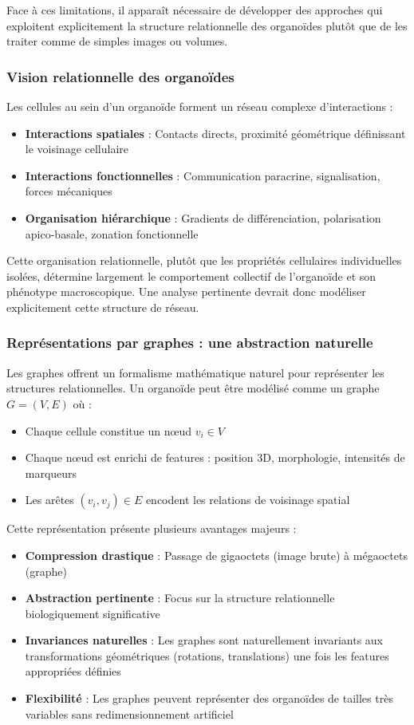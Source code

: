 Face à ces limitations, il apparaît nécessaire de développer des approches qui exploitent explicitement la structure relationnelle des organoïdes plutôt que de les traiter comme de simples images ou volumes.

\subsubsection{Vision relationnelle des organoïdes}

Les cellules au sein d'un organoïde forment un réseau complexe d'interactions :
\begin{itemize}
    \item \textbf{Interactions spatiales} : Contacts directs, proximité géométrique définissant le voisinage cellulaire
    \item \textbf{Interactions fonctionnelles} : Communication paracrine, signalisation, forces mécaniques
    \item \textbf{Organisation hiérarchique} : Gradients de différenciation, polarisation apico-basale, zonation fonctionnelle
\end{itemize}

Cette organisation relationnelle, plutôt que les propriétés cellulaires individuelles isolées, détermine largement le comportement collectif de l'organoïde et son phénotype macroscopique. Une analyse pertinente devrait donc modéliser explicitement cette structure de réseau.

\subsubsection{Représentations par graphes : une abstraction naturelle}

Les graphes offrent un formalisme mathématique naturel pour représenter les structures relationnelles. Un organoïde peut être modélisé comme un graphe $G = (V, E)$ où :
\begin{itemize}
    \item Chaque cellule constitue un nœud $v_i \in V$
    \item Chaque nœud est enrichi de features : position 3D, morphologie, intensités de marqueurs
    \item Les arêtes $(v_i, v_j) \in E$ encodent les relations de voisinage spatial
\end{itemize}

Cette représentation présente plusieurs avantages majeurs :
\begin{itemize}
    \item \textbf{Compression drastique} : Passage de gigaoctets (image brute) à mégaoctets (graphe)
    \item \textbf{Abstraction pertinente} : Focus sur la structure relationnelle biologiquement significative
    \item \textbf{Invariances naturelles} : Les graphes sont naturellement invariants aux transformations géométriques (rotations, translations) une fois les features appropriées définies
    \item \textbf{Flexibilité} : Les graphes peuvent représenter des organoïdes de tailles très variables sans redimensionnement artificiel
\end{itemize}

